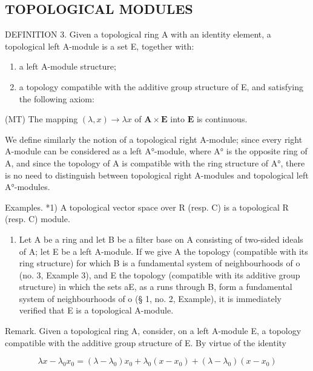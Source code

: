 \subsection{TOPOLOGICAL MODULES}

DEFINITION 3. Given a topological ring A with an identity element, a topological left A-module is a set E, together with:

\begin{enumerate}
\def\labelenumi{\arabic{enumi})}
\item
  a left A-module structure;
\item
  a topology compatible with the additive group structure of E, and satisfying the following axiom:
\end{enumerate}

(MT) The mapping \((\lambda, x) \to \lambda x\) of \(\mathbf{A} \times \mathbf{E}\) into \(\mathbf{E}\) is continuous.

We define similarly the notion of a topological right A-module; since every right A-module can be considered as a left A°-module, where A° is the opposite ring of A, and since the topology of A is compatible with the ring structure of A°, there is no need to distinguish between topological right A-modules and topological left A°-modules.

Examples. *1) A topological vector space over R (resp. C) is a topological R (resp. C) module.

\begin{enumerate}
\def\labelenumi{\arabic{enumi})}
\setcounter{enumi}{1}
\tightlist
\item
  Let A be a ring and let B be a filter base on A consisting of two-sided ideals of A; let E be a left A-module. If we give A the topology (compatible with its ring structure) for which B is a fundamental system of neighbourhoods of o (no. 3, Example 3), and E the topology (compatible with its additive group structure) in which the sets aE, as a runs through B, form a fundamental system of neighbourhoods of o (§ 1, no. 2, Example), it is immediately verified that E is a topological A-module.
\end{enumerate}

Remark. Given a topological ring A, consider, on a left A-module E, a topology compatible with the additive group structure of E. By virtue of the identity

\[
\lambda x - \lambda_ {0} x _ {0} = (\lambda - \lambda_ {0}) x _ {0} + \lambda_ {0} (x - x _ {0}) + (\lambda - \lambda_ {0}) (x - x _ {0})
\]

